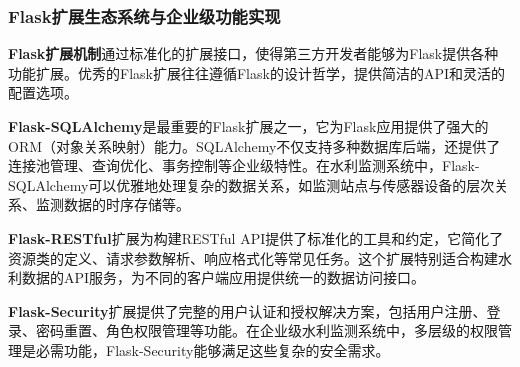 \begin{Shaded}
\begin{Highlighting}[]
\end{Highlighting}
\end{Shaded}

\subsubsection{Flask扩展生态系统与企业级功能实现}\label{flaskux6269ux5c55ux751fux6001ux7cfbux7edfux4e0eux4f01ux4e1aux7ea7ux529fux80fdux5b9eux73b0}

\textbf{Flask扩展机制}通过标准化的扩展接口，使得第三方开发者能够为Flask提供各种功能扩展。优秀的Flask扩展往往遵循Flask的设计哲学，提供简洁的API和灵活的配置选项。

\textbf{Flask-SQLAlchemy}是最重要的Flask扩展之一，它为Flask应用提供了强大的ORM（对象关系映射）能力。SQLAlchemy不仅支持多种数据库后端，还提供了连接池管理、查询优化、事务控制等企业级特性。在水利监测系统中，Flask-SQLAlchemy可以优雅地处理复杂的数据关系，如监测站点与传感器设备的层次关系、监测数据的时序存储等。

\textbf{Flask-RESTful}扩展为构建RESTful API提供了标准化的工具和约定，它简化了资源类的定义、请求参数解析、响应格式化等常见任务。这个扩展特别适合构建水利数据的API服务，为不同的客户端应用提供统一的数据访问接口。

\textbf{Flask-Security}扩展提供了完整的用户认证和授权解决方案，包括用户注册、登录、密码重置、角色权限管理等功能。在企业级水利监测系统中，多层级的权限管理是必需功能，Flask-Security能够满足这些复杂的安全需求。

